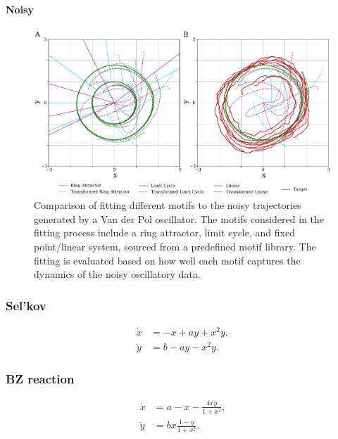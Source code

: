 \documentclass{article}
\theoremstyle{definition} \newtheorem{definition}{Definition}  \newtheorem{example}{Example}
\theoremstyle{remark} \newtheorem{remark}{Remark}
\newcounter{ct}
\begin{document}
\paragraph{Noisy}
\begin{figure}[htbp]
    \centering
    \includegraphics[width=.9\linewidth]{all_motifs_vdp_noisy_var1_ntraj5_ai}
    \caption{Comparison of fitting different motifs to the noisy trajectories generated by a Van der Pol oscillator. The motifs considered in the fitting process include a ring attractor, limit cycle, and fixed point/linear system, sourced from a predefined motif library. The fitting is evaluated based on how well each motif captures the dynamics of the noisy oscillatory data.}
    \label{fig:all_motifs_vdp}
\end{figure}



\subsubsection{Sel'kov}
\citep{selkov1968self}
\begin{equation}
\begin{aligned}
\dot{x} &= - x + ay + x^2y, \\
\dot{y} &= b - ay - x^2y.
\end{aligned}
\end{equation}

\subsubsection{BZ reaction}
\begin{equation}
\begin{aligned}
\dot{x} &= a - x - \frac{4xy}{1+x^2}, \\
\dot{y} &= bx \frac{1-y}{1+x^2}.
\end{aligned}
\end{equation}
\end{document}
